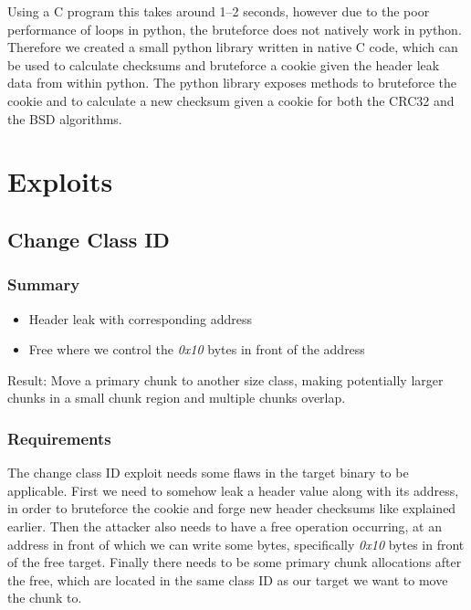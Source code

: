 \documentclass[a4paper,11pt,oneside]{report}
\begin{document}
Using a C program this takes around 1–2 seconds, however due to the poor performance of
loops in python, the bruteforce does not natively work in python. Therefore we created a
small python library written in native C code, which can be used to calculate checksums
and bruteforce a cookie given the header leak data from within python. The python library
exposes methods to bruteforce the cookie and to calculate a new checksum given a cookie
for both the CRC32 and the BSD algorithms.


\chapter{Exploits}

\section{Change Class ID}

\subsection{Summary}

\begin{itemize}
\item Header leak with corresponding address
\item Free where we control the \emph{0x10} bytes in front of the address
\end{itemize}

Result: Move a primary chunk to another size class, making potentially larger chunks in a
small chunk region and multiple chunks overlap.

\subsection{Requirements}

The change class ID exploit needs some flaws in the target binary to be applicable.  First
we need to somehow leak a header value along with its address, in order to bruteforce the
cookie and forge new header checksums like explained earlier. Then the attacker also needs
to have a free operation occurring, at an address in front of which we can write some
bytes, specifically \emph{0x10} bytes in front of the free target. Finally there needs to
be some primary chunk allocations after the free, which are located in the same class ID
as our target we want to move the chunk to.
\end{document}
